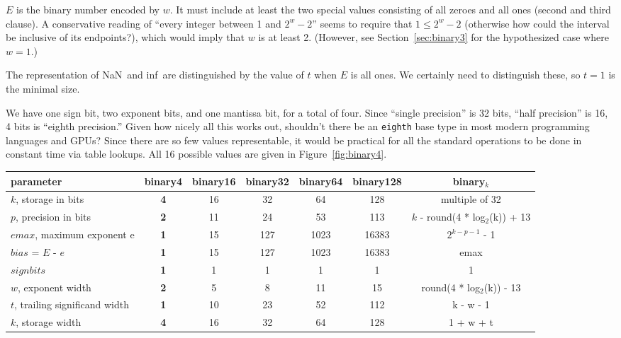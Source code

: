 \documentclass[twocolumn]{article}
\newcommand\nan{\textsf{NaN}}
\renewcommand\inf{\textsf{inf}}
\begin{document}
$E$ is the binary number encoded by $w$. It must include at least the
two special values consisting of all zeroes and all ones (second and
third clause). A conservative reading of ``every integer between 1 and
$2^w - 2$'' seems to require that $1 \leq 2^w - 2$ (otherwise how
could the interval be inclusive of its endpoints?), which would imply
that $w$ is at least 2. (However, see Section~\ref{sec:binary3} for
the hypothesized case where $w=1$.)

The representation of \nan\ and \inf\ are distinguished by the value
of $t$ when $E$ is all ones. We certainly need to distinguish these,
so $t = 1$ is the minimal size.

We have one sign bit, two exponent bits, and one mantissa bit, for a
total of four. Since ``single precision'' is 32 bits, ``half
precision'' is 16, 4 bits is ``eighth precision.'' Given how nicely
all this works out, shouldn't there be an {\tt eighth} base type in
most modern programming languages and GPUs? Since there are so few
values representable, it would be practical for all the standard
operations to be done in constant time via table lookups. All 16
possible values are given in Figure~\ref{fig:binary4}.


\begin{figure*}[tp]
\begin{tabular}{|l|c|c|c|c|c|c|}
  \hline
  parameter & {\bf binary4} & binary16 & binary32 & binary64 & binary128 & binary$_k$ \\
  \hline
  $k$, storage in bits & {\bf 4} & 16 & 32 & 64 & 128 & multiple of 32 \\
  $p$, precision in bits & {\bf 2} & 11 & 24 & 53 & 113 & $k$ - round(4 * log$_2$(k)) + 13 \\
  $emax$, maximum exponent e & {\bf 1} & 15 & 127 & 1023 & 16383 & $2^{k-p-1}$ - 1 \\
  $bias$ = $E$ - $e$ & {\bf 1} & 15 & 127 & 1023 & 16383 & emax \\
  $sign bits$ & {\bf 1} & 1 & 1 & 1 & 1 & 1 \\
  $w$, exponent width & {\bf 2} & 5 & 8 & 11 & 15 & round(4 * log$_2$(k)) - 13 \\
  $t$, trailing significand width & {\bf 1} & 10 & 23 & 52 & 112 & k - w - 1 \\
  $k$, storage width & {\bf 4} & 16 & 32 & 64 & 128 & 1 + w + t \\
\hline
\end{tabular}
\caption{Parameters for the newly-introduced {\bf binary4} encoding
  for IEEE-754, compared to the standard widths (see Table~3.5 in the
  standard\cite{ieee754}). } \label{fig:binary4}
\end{figure*}
\end{document}
